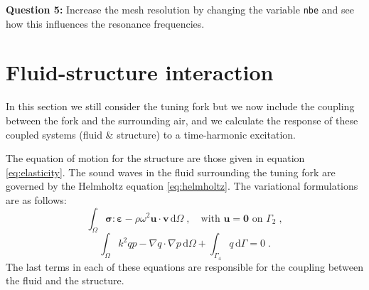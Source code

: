 \documentclass[english,3p]{elsarticle}
\newcommand{\code}[1]{\texttt{#1}}
\newcommand{\dd}{\mathrm{d}}
\begin{document}
\textbf{Question 5:} Increase the mesh resolution by changing the variable \code{nbe} and see how this influences the resonance frequencies.


\section{Fluid-structure interaction}

In this section we still consider the tuning fork but we now include the coupling between the fork and the surrounding air, and we calculate the response of these coupled systems (fluid \& structure) to a time-harmonic excitation.

The equation of motion for the structure are those given in equation \eqref{eq:elasticity}.
The sound waves in the fluid surrounding the tuning fork are governed by the Helmholtz equation \eqref{eq:helmholtz}.
The variational formulations are as follows:
$$
\int_\Omega \boldsymbol{\sigma}:\boldsymbol{\varepsilon} - \rho\omega^2\mathbf{u}\cdot\mathbf{v}\,\dd\Omega
\;,\quad
\text{with } \mathbf{u}=\mathbf{0} \text{ on } \Gamma_2
\;,
$$
$$
\int_\Omega k^2qp - \nabla q\cdot\nabla p\,\dd\Omega+
\int_{\Gamma_4} q\,\dd\Gamma
=0
\;.
$$
The last terms in each of these equations are responsible for the coupling between the fluid and the structure.
\end{document}
